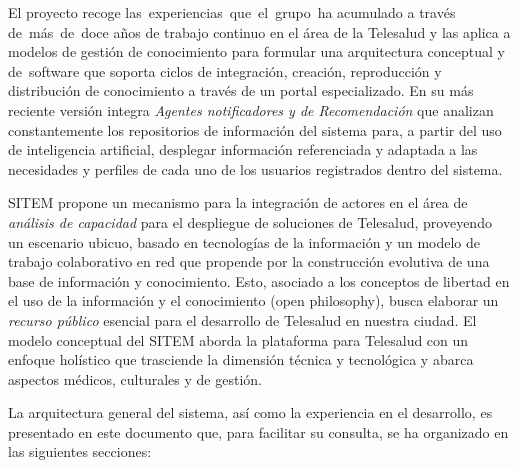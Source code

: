 El proyecto recoge las experiencias que el grupo ha acumulado a través de más de doce años de trabajo continuo en el área de la Telesalud y las aplica a modelos de gestión de conocimiento para formular una arquitectura conceptual y de software que soporta ciclos de integración, creación, reproducción y distribución de conocimiento a través de un portal especializado. En su más reciente versión integra \textit{Agentes notificadores y de Recomendación} que analizan constantemente los repositorios de información del sistema para, a partir del uso de inteligencia artificial, desplegar información referenciada y adaptada a las necesidades y perfiles de cada uno de los usuarios registrados dentro del sistema.

SITEM propone un mecanismo para la integración de actores en el área de \textit{análisis de capacidad} para el despliegue de soluciones de Telesalud, proveyendo un escenario ubicuo, basado en tecnologías de la información y un modelo de trabajo colaborativo en red que propende por la construcción evolutiva de una base de información y conocimiento. Esto, asociado a los conceptos de libertad en el uso de la información y el conocimiento (open philosophy), busca elaborar un \textit{recurso público} esencial para el desarrollo de Telesalud en nuestra ciudad. El modelo conceptual del SITEM aborda la plataforma para Telesalud con un enfoque holístico que trasciende la dimensión técnica y tecnológica y abarca aspectos médicos, culturales y de gestión. 

La arquitectura general del sistema, así como la experiencia en el desarrollo, es presentado en este documento que, para facilitar su consulta, se ha organizado en las siguientes secciones:

